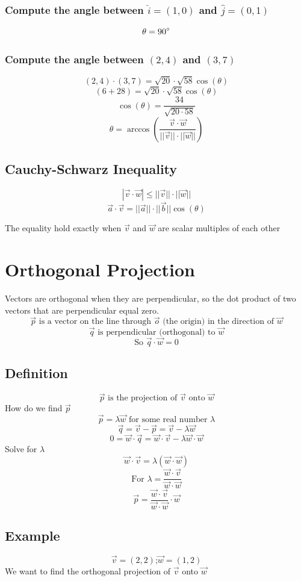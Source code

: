 \documentclass{article}
\begin{document}
\subsubsection{Compute the angle between $\hat{i}=(1,0)$ and $\hat{j}=(0,1)$}
\[\theta=90\degree\]
\subsubsection{Compute the angle between $(2,4)$ and $(3,7)$}
\[(2,4)\cdot(3,7)=\sqrt{20}\cdot\sqrt{58}\cos(\theta)\]
\[(6+28)=\sqrt{20}\cdot\sqrt{58}\cos(\theta)\]
\[\cos(\theta)=\frac{34}{\sqrt{20\cdot 58}}\]
\[\theta=\arccos(\frac{\vec{v}\cdot\vec{w}}{||\vec{v}||\cdot ||\vec{w}||})\]

\subsection{Cauchy-Schwarz Inequality}
\[|\vec{v}\cdot \vec{w}|\leq ||\vec{v}||\cdot||\vec{w}||\]
\[\vec{a}\cdot \vec{v}=||\vec{a}||\cdot ||\vec{b}||\cos(\theta)\]

The equality hold exactly when $\vec{v}$ and $\vec{w}$ are scalar multiples of each other

\section{Orthogonal Projection}
Vectors are orthogonal when they are perpendicular, so the dot product of two vectors that are 
perpendicular equal zero.
\[\vec{p} \mbox{ is a vector on the line through }\vec{o}\mbox{ (the origin)}\mbox{ in the direction of }\vec{w}\]
\[\vec{q} \mbox{ is perpendicular (orthogonal) to }\vec{w}\]
\[\mbox{So }\vec{q}\cdot\vec{w}=0\]

\subsection{Definition}
\[\vec{p} \mbox{ is the projection of } \vec{v} \mbox{ onto }\vec{w}\]
How do we find $\vec{p}$
\[\vec{p}=\lambda\vec{w}\mbox{ for some real number }\lambda\]
\[\vec{q}=\vec{v}-\vec{p}=\vec{v}-\lambda\vec{w}\]
\[0=\vec{w}\cdot\vec{q}=\vec{w}\cdot\vec{v}-\lambda\vec{w}\cdot \vec{w}\]
\newline
Solve for $\lambda$
\[\vec{w}\cdot \vec{v}=\lambda(\vec{w}\cdot\vec{w})\]
\[\mbox{For }\lambda=\frac{\vec{w}\cdot\vec{v}}{\vec{w}\cdot\vec{w}}\]
\[\vec{p}=\frac{\vec{w}\cdot\vec{v}}{\vec{w}\cdot\vec{w}}\cdot \vec{w}\]

\subsection*{Example}
\[\vec{v}=(2,2) \mbox{;}\vec{w}=(1,2)\]
We want to find the orthogonal projection of $\vec{v}$ onto $\vec{w}$
\end{document}
